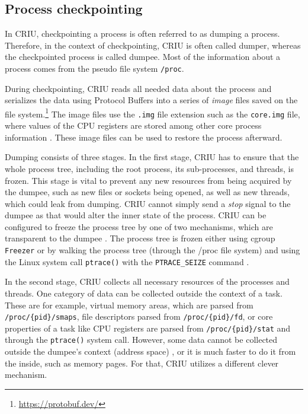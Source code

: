\documentclass[
  digital,     %
  oneside,     %
  nosansbold,  %
  nocolorbold, %
  lof,         %
  nolot,         %
]{fithesis4}
\begin{document}
\subsection{Process checkpointing}
In CRIU, checkpointing a process is often referred to as dumping a process. Therefore, in the context of checkpointing, CRIU is often called dumper, whereas the checkpointed process is called dumpee. Most of the information about a process comes from the pseudo file system \texttt{/proc}. 

During checkpointing, CRIU reads all needed data about the process and serializes the data using Protocol Buffers into a series of \emph{image} files saved on the file system.\footnote{\url{https://protobuf.dev/}} The image files use the \texttt{.img} file extension such as the \texttt{core.img} file, where values of the CPU registers are stored among other core process information \cite{criu_images}. These image files can be used to restore the process afterward. 

Dumping consists of three stages. In the first stage, CRIU has to ensure that the whole process tree, including the root process, its sub-processes, and threads, is frozen. This stage is vital to prevent any new resources from being acquired by the dumpee, such as new files or sockets being opened, as well as new threads, which could leak from dumping. CRIU cannot simply send a \emph{stop} signal to the dumpee as that would alter the inner state of the process. CRIU can be configured to freeze the process tree by one of two mechanisms, which are transparent to the dumpee \cite{criu_freezing}. The process tree is frozen either using cgroup \texttt{Freezer} or by walking the process tree (through the /proc file system) and using the Linux system call \texttt{ptrace()} with the \texttt{PTRACE\_SEIZE} command \cite{criu_cr}.

In the second stage, CRIU collects all necessary resources of the processes and threads. One category of data can be collected outside the context of a task. These are for example, virtual memory areas, which are parsed from \texttt{/proc/\{pid\}/smaps}, file descriptors parsed from \texttt{/proc/\{pid\}/fd}, or core properties of a task like CPU registers are parsed from \texttt{/proc/\{pid\}/stat} and through the \texttt{ptrace()} system call. However, some data cannot be collected outside the dumpee's context (address space) \cite{criu_cr}, or it is much faster to do it from the inside, such as memory pages. For that, CRIU utilizes a different clever mechanism.
\end{document}
